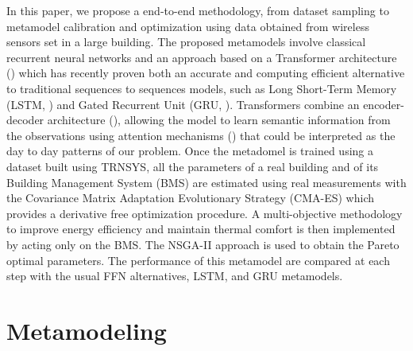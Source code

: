 \documentclass[12pt]{article}
\begin{document}
In this paper, we propose a end-to-end methodology, from dataset sampling to metamodel calibration and optimization using data obtained from wireless sensors set in a large building. The proposed metamodels involve classical recurrent neural networks and an approach based on a Transformer architecture (\cite{Vaswani2017AttentionIA}) which has recently proven both an accurate and computing efficient alternative to traditional sequences to sequences models, such as Long Short-Term Memory (LSTM, \cite{Hochreiter1997LongSM}) and Gated Recurrent Unit (GRU, \cite{Cho2014LearningPR}). Transformers combine an encoder-decoder architecture (\cite{Cho2014LearningPR, Bahdanau2014NeuralMT}), allowing the model to learn semantic information from the observations using attention mechanisms (\cite{Parikh2016ADA, Zhu2019AnES}) that could be interpreted as the day to day patterns of our problem. Once the metadomel is trained using a dataset built using TRNSYS,  all the parameters of a real building and of its Building Management System (BMS) are estimated using real measurements with the Covariance Matrix Adaptation Evolutionary Strategy (CMA-ES) \cite{igel:hansen:roth:2007} which provides a derivative free optimization procedure. A multi-objective methodology to improve energy efficiency
and maintain thermal comfort is then implemented by
acting only on the BMS. The NSGA-II approach is used to
obtain the Pareto optimal parameters. The performance of
this metamodel  are compared at each step with the usual FFN alternatives, LSTM, and GRU  metamodels.


\section{Metamodeling}
\label{sec:models}
\end{document}

